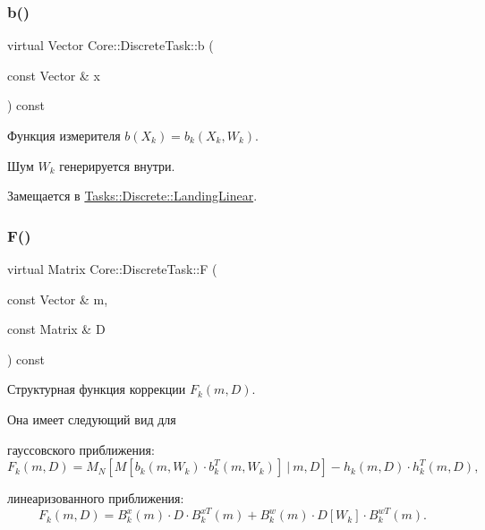 \subsubsection{\texorpdfstring{b()}{b()}}
{\footnotesize\ttfamily virtual Vector Core\+::\+Discrete\+Task\+::b (\begin{DoxyParamCaption}\item[{const Vector \&}]{x }\end{DoxyParamCaption}) const\hspace{0.3cm}{\ttfamily [pure virtual]}}



Функция измерителя $b(X_k) = b_k(X_k, W_k)$. 

Шум $W_k$ генерируется внутри. 

Замещается в \hyperlink{class_tasks_1_1_discrete_1_1_landing_linear_a599d3491da6d84ba68c43433235e9980}{Tasks\+::\+Discrete\+::\+Landing\+Linear}.

\hypertarget{class_core_1_1_discrete_task_ac55ca2cd47f0c9f7e5d3d3704becee46}{}\label{class_core_1_1_discrete_task_ac55ca2cd47f0c9f7e5d3d3704becee46} 
\subsubsection{\texorpdfstring{F()}{F()}}
{\footnotesize\ttfamily virtual Matrix Core\+::\+Discrete\+Task\+::F (\begin{DoxyParamCaption}\item[{const Vector \&}]{m,  }\item[{const Matrix \&}]{D }\end{DoxyParamCaption}) const\hspace{0.3cm}{\ttfamily [pure virtual]}}



Структурная функция коррекции $F_k(m, D)$. 

Она имеет следующий вид для


\begin{DoxyItemize}
\item гауссовского приближения\+: \[F_k(m, D) = M_N[M[b_k(m, W_k)\cdot b_k^T(m, W_k)] \ |\ m, D] - h_k(m,D) \cdot h_k^T(m, D),\]
\item линеаризованного приближения\+: \[F_k(m, D) = B_k^x(m) \cdot D \cdot B_k^{xT}(m) + B_k^w(m) \cdot D[W_k] \cdot B_k^{wT}(m).\]
\end{DoxyItemize}

